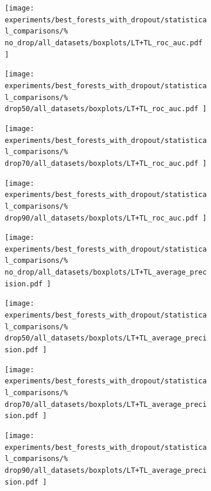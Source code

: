 \begin{figure}[tbh]
    \centering
    \begin{subfigure}{0.24\textwidth}
        \texttt{[image: 
            experiments/best\_forests\_with\_dropout/statistical\_comparisons/\%
            no\_drop/all\_datasets/boxplots/LT+TL\_roc\_auc.pdf
        ]}
    \end{subfigure}
    \begin{subfigure}{0.24\textwidth}
        \texttt{[image: 
            experiments/best\_forests\_with\_dropout/statistical\_comparisons/\%
            drop50/all\_datasets/boxplots/LT+TL\_roc\_auc.pdf
        ]}
    \end{subfigure}
    \begin{subfigure}{0.24\textwidth}
        \texttt{[image: 
            experiments/best\_forests\_with\_dropout/statistical\_comparisons/\%
            drop70/all\_datasets/boxplots/LT+TL\_roc\_auc.pdf
        ]}
    \end{subfigure}
    \begin{subfigure}{0.24\textwidth}
        \texttt{[image: 
            experiments/best\_forests\_with\_dropout/statistical\_comparisons/\%
            drop90/all\_datasets/boxplots/LT+TL\_roc\_auc.pdf
        ]}
    \end{subfigure}

    \begin{subfigure}{0.24\textwidth}
        \texttt{[image: 
            experiments/best\_forests\_with\_dropout/statistical\_comparisons/\%
            no\_drop/all\_datasets/boxplots/LT+TL\_average\_precision.pdf
        ]}
    \end{subfigure}
    \begin{subfigure}{0.24\textwidth}
        \texttt{[image: 
            experiments/best\_forests\_with\_dropout/statistical\_comparisons/\%
            drop50/all\_datasets/boxplots/LT+TL\_average\_precision.pdf
        ]}
    \end{subfigure}
    \begin{subfigure}{0.24\textwidth}
        \texttt{[image: 
            experiments/best\_forests\_with\_dropout/statistical\_comparisons/\%
            drop70/all\_datasets/boxplots/LT+TL\_average\_precision.pdf
        ]}
    \end{subfigure}
    \begin{subfigure}{0.24\textwidth}
        \texttt{[image: 
            experiments/best\_forests\_with\_dropout/statistical\_comparisons/\%
            drop90/all\_datasets/boxplots/LT+TL\_average\_precision.pdf
        ]}
    \end{subfigure}


\end{figure}

